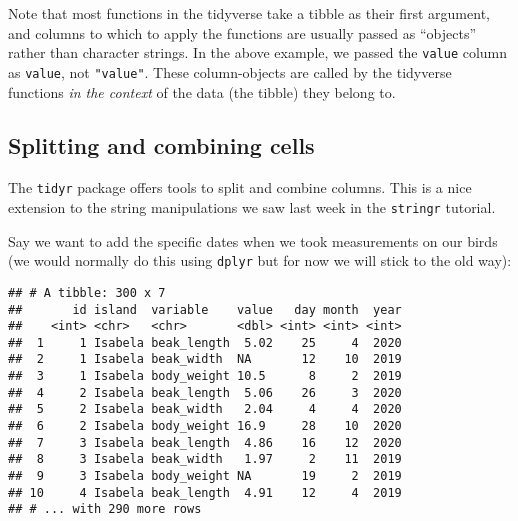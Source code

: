 \documentclass[
]{book}
\newenvironment{Shaded}{}{}
\newcommand{\CommentTok}[1]{\textcolor[rgb]{0.38,0.63,0.69}{\textit{#1}}}
\newcommand{\DataTypeTok}[1]{\textcolor[rgb]{0.56,0.13,0.00}{#1}}
\newcommand{\DecValTok}[1]{\textcolor[rgb]{0.25,0.63,0.44}{#1}}
\newcommand{\KeywordTok}[1]{\textcolor[rgb]{0.00,0.44,0.13}{\textbf{#1}}}
\newcommand{\NormalTok}[1]{#1}
\newcommand{\OperatorTok}[1]{\textcolor[rgb]{0.40,0.40,0.40}{#1}}
\newcommand{\OtherTok}[1]{\textcolor[rgb]{0.00,0.44,0.13}{#1}}
\newcommand{\StringTok}[1]{\textcolor[rgb]{0.25,0.44,0.63}{#1}}
\begin{document}
Note that most functions in the tidyverse take a tibble as their first argument, and columns to which to apply the functions are usually passed as ``objects'' rather than character strings. In the above example, we passed the \texttt{value} column as \texttt{value}, not \texttt{"value"}. These column-objects are called by the tidyverse functions \emph{in the context} of the data (the tibble) they belong to.

\hypertarget{splitting-and-combining-cells}{%
\subsection{Splitting and combining cells}\label{splitting-and-combining-cells}}

The \texttt{tidyr} package offers tools to split and combine columns. This is a nice extension to the string manipulations we saw last week in the \texttt{stringr} tutorial.

Say we want to add the specific dates when we took measurements on our birds (we would normally do this using \texttt{dplyr} but for now we will stick to the old way):

\begin{Shaded}
\end{Shaded}

\begin{verbatim}
## # A tibble: 300 x 7
##       id island  variable    value   day month  year
##    <int> <chr>   <chr>       <dbl> <int> <int> <int>
##  1     1 Isabela beak_length  5.02    25     4  2020
##  2     1 Isabela beak_width  NA       12    10  2019
##  3     1 Isabela body_weight 10.5      8     2  2019
##  4     2 Isabela beak_length  5.06    26     3  2020
##  5     2 Isabela beak_width   2.04     4     4  2020
##  6     2 Isabela body_weight 16.9     28    10  2020
##  7     3 Isabela beak_length  4.86    16    12  2020
##  8     3 Isabela beak_width   1.97     2    11  2019
##  9     3 Isabela body_weight NA       19     2  2019
## 10     4 Isabela beak_length  4.91    12     4  2019
## # ... with 290 more rows
\end{verbatim}
\end{document}
